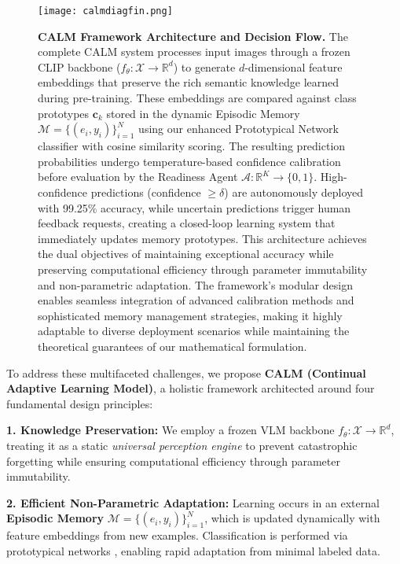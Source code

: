 \documentclass[conference]{IEEEtran}
\begin{document}
\begin{figure*}[t]
\centering
\texttt{[image: calmdiagfin.png]}
\caption{\textbf{CALM Framework Architecture and Decision Flow.} The complete CALM system processes input images through a frozen CLIP backbone ($f_\theta: \mathcal{X} \rightarrow \mathbb{R}^d$) to generate $d$-dimensional feature embeddings that preserve the rich semantic knowledge learned during pre-training. These embeddings are compared against class prototypes $\mathbf{c}_k$ stored in the dynamic Episodic Memory $\mathcal{M} = \{(e_i, y_i)\}_{i=1}^N$ using our enhanced Prototypical Network classifier with cosine similarity scoring. The resulting prediction probabilities undergo temperature-based confidence calibration before evaluation by the Readiness Agent $\mathcal{A}: \mathbb{R}^K \rightarrow \{0,1\}$. High-confidence predictions (confidence $\geq \delta$) are autonomously deployed with 99.25\% accuracy, while uncertain predictions trigger human feedback requests, creating a closed-loop learning system that immediately updates memory prototypes. This architecture achieves the dual objectives of maintaining exceptional accuracy while preserving computational efficiency through parameter immutability and non-parametric adaptation. The framework's modular design enables seamless integration of advanced calibration methods and sophisticated memory management strategies, making it highly adaptable to diverse deployment scenarios while maintaining the theoretical guarantees of our mathematical formulation.}
\label{fig:architecture}
\end{figure*}

To address these multifaceted challenges, we propose \textbf{CALM (Continual Adaptive Learning Model)}, a holistic framework architected around four fundamental design principles:

\textbf{1. Knowledge Preservation:} We employ a frozen VLM backbone $f_\theta: \mathcal{X} \rightarrow \mathbb{R}^d$, treating it as a static \textit{universal perception engine} to prevent catastrophic forgetting while ensuring computational efficiency through parameter immutability.

\textbf{2. Efficient Non-Parametric Adaptation:} Learning occurs in an external \textbf{Episodic Memory} $\mathcal{M} = \{(e_i, y_i)\}_{i=1}^N$, which is updated dynamically with feature embeddings from new examples. Classification is performed via prototypical networks \cite{snell2017prototypical}, enabling rapid adaptation from minimal labeled data.
\end{document}
